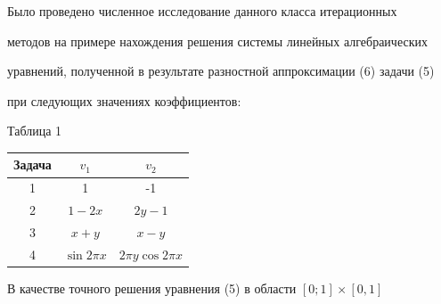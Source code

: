  


Было проведено численное исследование данного класса итерационных 


методов на примере нахождения решения системы линейных алгебраических 


уравнений, полученной в результате разностной аппроксимации (6) задачи (5) 


при следующих значениях коэффициентов: 


\medskip 







{\hfill Таблица 1\hfill} 


 







\par


\bigskip


{\hfill


{\begin{tabular}{|c|c|c|} 


\hline 


Задача & $v_1$ & $v_2$ \\ 


\hline 


1 & 1 & -1 \\ 


\hline 


2 & $1-2x$ & $2y-1$ \\ 


\hline 


3 & $x+y$ & $x-y$ \\ 


\hline 


4 & $\sin 2\pi x$ & $2\pi y \cos 2\pi x$\\ 


\hline 


\end{tabular} 


}


\hfill}


\par 


\bigskip


В качестве точного решения уравнения (5) в области $[0;1]\times [0,1]$ 


